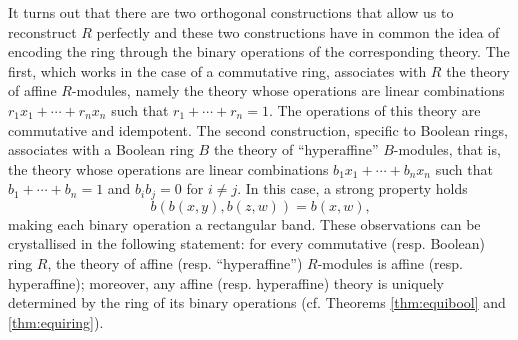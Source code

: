 \documentclass{amsart}
\numberwithin{equation}{section}
\theoremstyle{plain}
\theoremstyle{definition}
\begin{document}
It turns out that there are two orthogonal constructions that allow us to reconstruct $R$ perfectly
and these two constructions have in common the idea of encoding the ring through the binary operations of the corresponding theory. 
The first, which works in the case of a commutative ring, associates with $R$ the theory of affine $R$-modules, namely the theory whose operations are linear combinations $r_1x_1+\cdots+r_nx_n$ such that $r_1+\cdots+r_n=1$. 
The operations of this theory are commutative and idempotent.
The second construction, specific to Boolean rings, associates with a Boolean ring $B$ the theory of ``hyperaffine'' $B$-modules, that is, the theory whose operations are linear combinations $b_1x_1+\cdots+b_nx_n$ such that $b_1+\cdots+b_n=1$ and $b_i b_j =0$ for $i \neq j$. 
In this case, a strong property holds
\begin{equation}
b(b(x,y), b(z,w)) = b(x,w) \text{,}
\end{equation}
making each binary operation a rectangular band. 
These observations can be crystallised in the following statement:
for every commutative (resp. Boolean) ring $R$, the theory of affine (resp. ``hyperaffine'') $R$-modules is affine (resp. hyperaffine); 
moreover, any affine (resp. hyperaffine) theory is uniquely determined by the ring of its binary operations 
(cf. Theorems \ref{thm:equibool} and \ref{thm:equiring}).

\end{document}
